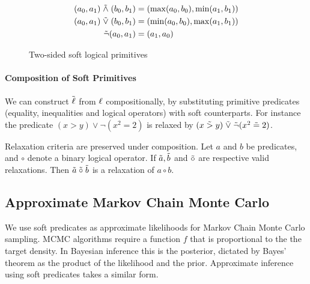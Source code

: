 \begin{figure}
\begin{align*}
(a_0, a_1) \mathrel{\tilde{\land}} (b_0, b_1) &= (\max(a_0, b_0), \min(a_1, b_1))\\
(a_0, a_1) \mathrel{\tilde{\lor}} (b_0, b_1) &= (\min(a_0, b_0), \max(a_1, b_1))\\
\tilde{\neg}(a_0, a_1) &= (a_1, a_0)
\end{align*}
\caption{Two-sided soft logical primitives}
\label{softw}
\end{figure}


\paragraph{Composition of Soft Primitives} We can construct $\mathrel{\tilde{\operatorname{\ell}}}$ from $\operatorname{\ell}$ compositionally, by substituting primitive predicates (equality, inequalities and logical operators) with soft counterparts.
For instance the predicate $(x > y) \lor \neg(x^2 = 2)$ is relaxed by $(x \mathrel{\tilde{>}} y) \mathrel{\tilde{\lor}} \tilde{\neg}(x^2 \mathrel{\tilde{=}} 2)$.

\begin{proposition}Relaxation criteria are preserved under composition.
Let $a$ and $b$ be predicates, and $\circ$ denote a binary logical operator.  If $\tilde{a}, \tilde{b}$ and $\mathrel{\tilde{\circ}}$ are respective valid relaxations.  Then $\tilde{a} \mathrel{\tilde{\circ}} \tilde{b}$ is a relaxation of $a \circ b$.
\end{proposition}



\subsection{Approximate Markov Chain Monte Carlo}
We use soft predicates as approximate likelihoods for Markov Chain Monte Carlo sampling.
MCMC algorithms require a function $f$ that is proportional to the the target density.
In Bayesian inference this is the posterior, dictated by Bayes' theorem as the product of the likelihood and the prior.
Approximate inference using soft predicates takes a similar form.

